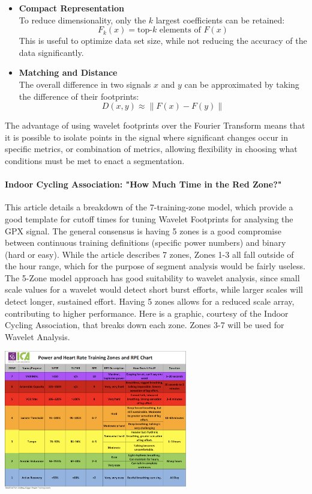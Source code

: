 \documentclass[12pt,a4paper]{report}
\begin{document}
\begin{itemize}
	\item \textbf{Compact Representation}\\
	      To reduce dimensionality, only the $k$ largest coefficients can be retained:
	      \[
		      F_k(x) = \text{top-}k \text{ elements of } F(x)
	      \]
	      This is useful to optimize data set size, while not reducing the accuracy of the data significantly.
	\item \textbf{Matching and Distance}\\
	      The overall difference in two signals $x$ and $y$ can be approximated by taking the difference of their footprints:
	      \[
		      D(x,y) \approx \| F(x) - F(y) \|
	      \]

\end{itemize}

The advantage of using wavelet footprints over the Fourier Transform means that it is possible to isolate points in the signal where significant changes occur in specific metrics, or combination of metrics, allowing flexibility in choosing
what conditions must be met to enact a segmentation.

\paragraph{Indoor Cycling Association: "How Much Time in the Red Zone?"}
This article details a breakdown of the 7-training-zone model, which provide a good template for cutoff times for tuning Wavelet Footprints for analysing the GPX signal.
The general consensus is having 5 zones is a good compromise between continuous training definitions (specific power numbers) and binary (hard or easy). While the article describes 7 zones,
Zones 1-3 all fall outside of the hour range, which for the purpose of segment analysis would be fairly useless. The 5-Zone model approach
has good suitability to wavelet analysis, since small scale values for a wavelet would detect short burst efforts, while larger scales will detect longer, sustained effort.
Having 5 zones allows for a reduced scale array, contributing to higher performance. Here is a graphic, courtesy of the Indoor Cycling Association, that breaks down each zone. Zones 3-7 will be used for Wavelet Analysis.
\begin{center}
	\includegraphics[width=0.6\textwidth]{zones.png}
\end{center}
\end{document}
